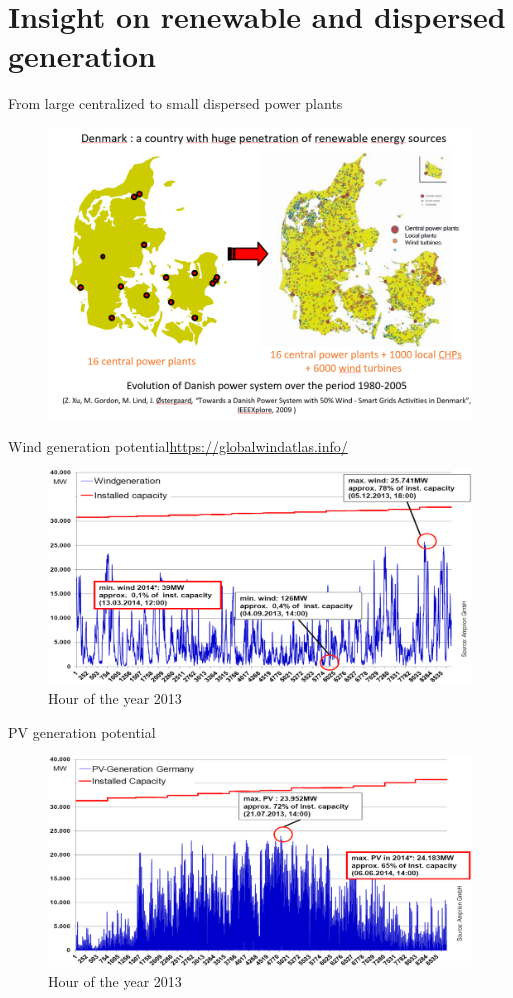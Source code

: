 \section{Insight on renewable and dispersed generation}

\begin{frame}
{From large centralized to small dispersed power plants}
\begin{figure}
\centering
\includegraphics[width=0.6\linewidth]{images/danemark_RES.png}
\end{figure}
\end{frame}

\begin{frame}
{Wind generation potential}\url{https://globalwindatlas.info/}
\begin{figure}
\centering
\includegraphics[width=0.6\linewidth]{images/wind_gen_DE.png}
\caption*{Hour of the year 2013}
\end{figure}
\end{frame}

\begin{frame}{PV generation potential}
\begin{figure}
\centering
\includegraphics[width=0.6\linewidth]{images/PV_gen_DE.png}
\caption*{Hour of the year 2013}
\end{figure}
\end{frame}

